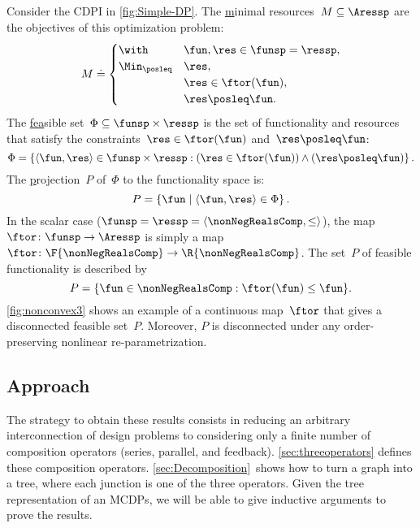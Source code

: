 \begin{example}
  \label{exa:one}
  Consider the CDPI in \cref{fig:Simple-DP}. The \uline{m}inimal resources~$M\subseteq\Aressp$ are the objectives of this optimization problem:
  \[
    M\doteq\begin{cases}
             \with & \fun,\res\in\funsp=\ressp,\\
             \Min_{\posleq} & \res,\\
             & \res\in\ftor(\fun),\\
             & \res\posleq\fun.
    \end{cases}
  \]
  The \uline{fea}sible set~$\Phi\subseteq\funsp\times\ressp$ is
  the set of functionality and resources that satisfy the constraints~$\res\in\ftor(\fun)$
  and~$\res\posleq\fun$:
  \begin{equation}
    \Phi=\left\{ \langle\fun,\res\rangle\in\funsp\times\ressp:(\res\in\ftor(\fun))\wedge(\res\posleq\fun)\right\} .\label{eq:feasible}
  \end{equation}
  The \uline{p}rojection~$P$ of~$\Phi$ to the functionality space
  is:
  \[
    P=\left\{ \fun\mid\left\langle \fun,\res\right\rangle \in\Phi\right\}.
  \]
  In the scalar case ($\funsp=\ressp=\langle\nonNegRealsComp,\leq\rangle$),
  the map~$\ftor\colon\funsp\rightarrow\Aressp$ is simply a map~$\ftor\colon\F{\nonNegRealsComp}\rightarrow\R{\nonNegRealsComp}$.
  The set~$P$ of feasible functionality is described by
  \begin{equation}
    P=\{\fun\in\nonNegRealsComp:\ftor(\fun)\leq\fun\}.\label{eq:Pfeasible}
  \end{equation}
  \cref{fig:nonconvex3} shows an example of a continuous map~$\ftor$
  that gives a disconnected feasible set~$P$. Moreover, $P$ is disconnected
  under any order-preserving nonlinear re-parametrization.

\end{example}

\subsection{Approach}

The strategy to obtain these results consists in reducing an arbitrary
interconnection of design problems to considering only a finite
number of composition operators (series, parallel, and feedback).
\cref{sec:threeoperators} defines these composition operators. \cref{sec:Decomposition}~shows
how to turn a graph into a tree, where each junction is one of the
three operators. Given the tree representation of an MCDPs, we will
be able to give inductive arguments to prove the results.


